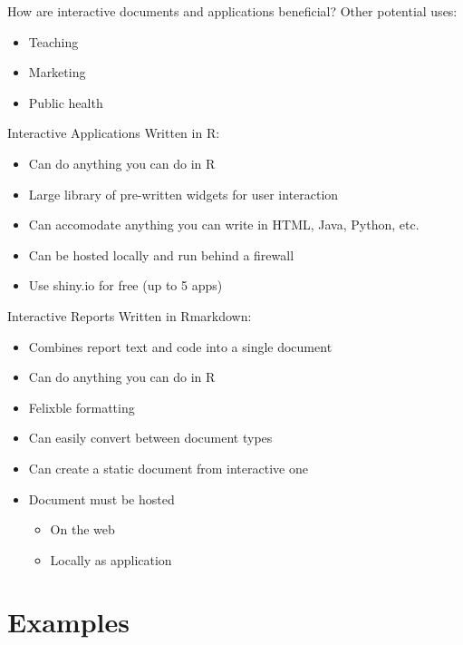 \documentclass{beamer}\usepackage[]{graphicx}\usepackage[]{color}
\begin{document}
\begin{frame}{How are interactive documents and applications beneficial?}
Other potential uses:
\bigskip
\begin{itemize}
\item Teaching
\bigskip
\pause
\item Marketing
\bigskip
\pause
\item Public health
\end{itemize}
\end{frame}


\begin{frame}{Interactive Applications}
Written in R:
\begin{itemize}
\item Can do anything you can do in R
\smallskip
\item Large library of pre-written widgets for user interaction
\smallskip
\item Can accomodate anything you can write in HTML, Java, Python, etc.
\smallskip
\item Can be hosted locally and run behind a firewall
\smallskip
\item Use shiny.io for free (up to 5 apps)
\end{itemize}
\end{frame}

\begin{frame}{Interactive Reports}
Written in Rmarkdown:
\begin{itemize}
\item Combines report text and code into a single document
\smallskip
\item Can do anything you can do in R 
\smallskip
\item Felixble formatting
\smallskip
\item Can easily convert between document types
\smallskip
\item Can create a static document from interactive one
\smallskip
\item Document must be hosted
\pause
  \begin{itemize}
  \item On the web
  \item Locally as application
  \end{itemize}
\end{itemize}
\end{frame}

\section{Examples}
\end{document}
